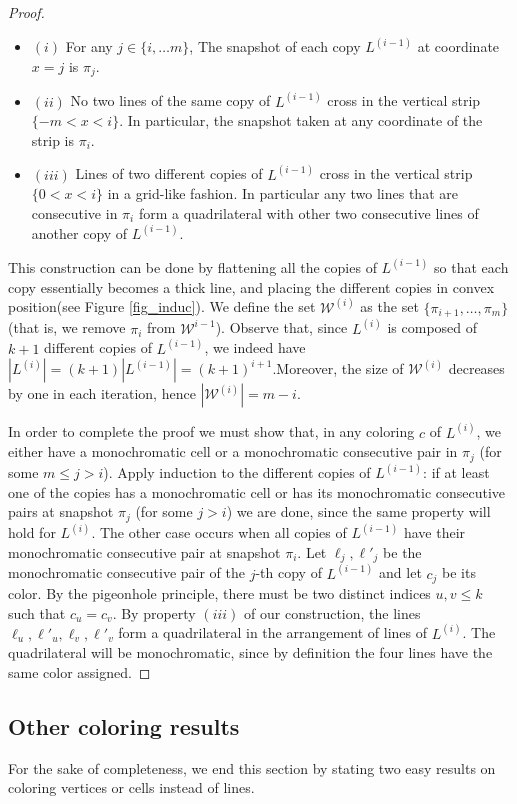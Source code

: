 \documentclass[11pt,a4paper]{article}
\newcommand{\sholong}[2]{#2}
\begin{document}
\begin{proof}
\begin{itemize}
\item $(i)$ For any $j\in \{i,\ldots m\}$, The snapshot of each copy $L^{(i-1)}$ at coordinate $x=j$ is $\pi_j$.
\item $(ii)$ No two lines of the same copy  of $L^{(i-1)}$ cross in the vertical strip $\{-m<x<i\}$. In particular,  the snapshot taken at any coordinate of the strip is $\pi_i$.
\item $(iii)$ Lines of two different copies of $L^{(i-1)}$ cross in the  vertical strip $\{0<x<i\}$ in a grid-like fashion. In particular any two lines that are consecutive in $\pi_i$ form a quadrilateral with other two consecutive lines of another copy of $L^{(i-1)}$.
\end{itemize}
This construction can be done by flattening all the copies of $L^{(i-1)}$ so that each copy essentially becomes a thick line, and placing the different copies in convex position\sholong{.}{(see Figure \ref{fig_induc}). We define the set $\mathcal{W}^{(i)}$ as the set $\{\pi_{i+1}, \ldots, \pi_m\}$ (that is, we remove $\pi_i$ from $\mathcal{W}^{i-1}$).}
 Observe that, since $L^{(i)}$ is composed of $k+1$ different copies of $L^{(i-1)}$, we indeed have $|L^{(i)}|=(k+1)|L^{(i-1)}|=(k+1)^{i+1}$.\sholong{}{Moreover, the size of $\mathcal{W}^{(i)}$ decreases by one in each iteration, hence $|\mathcal{W}^{(i)}|=m-i$.}

In order to complete the proof we must show that, in any coloring $c$ of $L^{(i)}$, we either have a monochromatic cell or a  monochromatic consecutive pair in $\pi_j$ (for some $m\leq j>i$). Apply induction to the different copies of $L^{(i-1)}$: if at least one of the copies has a monochromatic cell or has its monochromatic consecutive pairs at snapshot $\pi_j$ (for some $j>i$) we are done, since the same property will hold for $L^{(i)}$. The other case occurs when all copies of $L^{(i-1)}$ have their monochromatic consecutive pair at snapshot $\pi_i$. Let $\ell_j,\ell'_j$ be the monochromatic consecutive pair of the $j$-th copy of $L^{(i-1)}$ and let $c_j$ be its color. By the pigeonhole principle, there must be two distinct indices $u,v\leq k$ such that $c_u=c_v$. By property $(iii)$ of our construction, the lines $\ell_u,\ell'_u,\ell_v,\ell'_v $ form a quadrilateral in the arrangement of lines of $L^{(i)}$. The quadrilateral will be monochromatic, since by definition the four lines have the same color assigned.
\end{proof}

\subsection{Other coloring results}
For the sake of completeness, we end this section by stating two easy results on coloring vertices or cells instead of lines.
\end{document}

